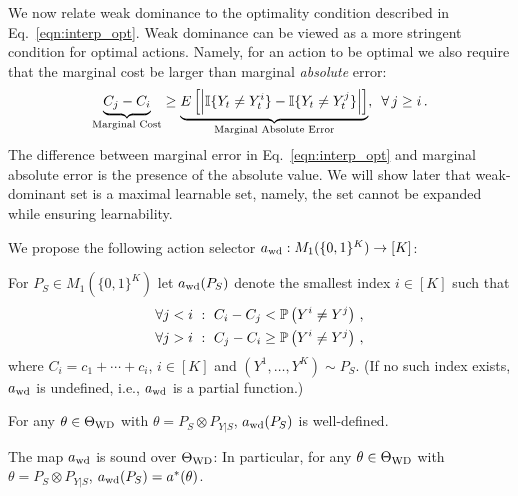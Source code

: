 We now relate weak dominance to the optimality condition described in Eq.~\eqref{eqn:interp_opt}. Weak dominance can be viewed as a more stringent condition for optimal actions. Namely, for an action to be optimal we also require that the marginal cost be larger than marginal \emph{absolute} error:
\begin{equation} \label{eqn:interp_WD}
\underbrace{C_j - C_i}_{\text{Marginal Cost}} \geq \underbrace{ E \left [ \left | \mathbb{I}\{Y_t \ne Y_t^i\} - \mathbb{I}\{Y_t \ne Y_t^j\} \right | \right ]}_{\text{Marginal Absolute Error}},\,\,\, \forall \, j \geq i\,.
\end{equation}
The difference between marginal error in Eq.~\eqref{eqn:interp_opt} and marginal absolute error is the presence of the absolute value. We will show later that weak-dominant set is a maximal learnable set, namely, the set cannot be expanded while ensuring learnability.


We propose the following action selector $a_{\mathrm{wd}}: M_1(\{0,1\}^K)  \to [K]$:
\begin{defi}\label{def:awd}
For $P_S \in M_1(\{0,1\}^K) $ let $a_{\mathrm{wd}}(P_S)$ denote the smallest index $i\in [K]$ such that
\begin{subequations}
\begin{align}
\forall j<i \,\,:\,\, C_i - C_j < \mathbb{P}\left( Y^i \ne Y^j \right)\,, \label{eq:wd1}\\ 
\forall j>i \,\,:\,\, C_j - C_i \ge \mathbb{P}\left( Y^i \ne Y^j \right)\,, \label{eq:wd2}
\end{align}
\end{subequations}
where $C_i = c_1+\cdots + c_i$, $i\in [K]$ and $(Y^1,\dots,Y^K) \sim P_S$.
(If no such index exists, $a_{\mathrm{wd}}$ is undefined, i.e., $a_{\mathrm{wd}}$ is a partial function.)
\end{defi}
\begin{prop}
\label{prop:awdwelldef}
For any $\theta \in \Theta_{\mathrm{WD}}$ with $\theta = P_S\otimes P_{Y|S}$, $a_{\mathrm{wd}}(P_S)$ is well-defined.
\end{prop}

\begin{prop}
\label{prop:awdsound}
The map $a_{\mathrm{wd}}$ is sound over $\Theta_{\mathrm{WD}}$: In particular, for any
$\theta\in \Theta_{\mathrm{WD}}$ with $\theta = P_S\otimes P_{Y|S}$, $a_{\mathrm{wd}}(P_S)= a^*(\theta)$.
\end{prop}

